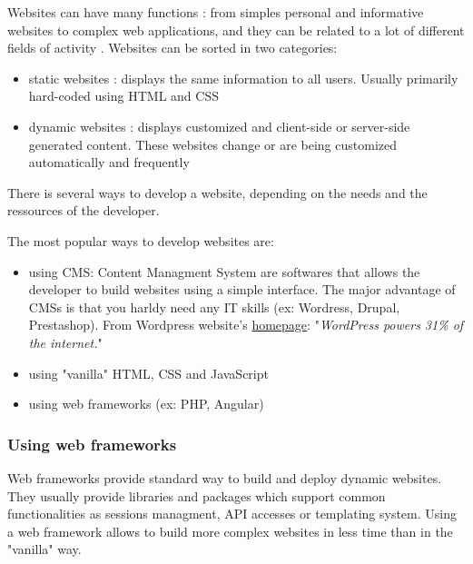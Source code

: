 \documentclass{article}
\begin{document}
                        Websites can have many functions : from simples personal and informative websites to complex web applications,
                        and they can be related to a lot of different fields of activity \cite{fields}.
                        Websites can be sorted in two categories:
                            \begin{itemize}
                                \item{static websites : displays the same information to all users. Usually primarily hard-coded using HTML and CSS}
                                \item{dynamic websites : displays customized and client-side or server-side generated content. These websites change or are being customized
                                automatically and frequently}
                            \end{itemize}
                        There is several ways to develop a website, depending on the needs and the ressources of the developer.

                        The most popular ways to develop websites are:
                            \begin{itemize}     
                                \item{using CMS: Content Managment System are softwares that allows the developer to build websites
                                using a simple interface.
                                The major advantage of CMSs is that you harldy need any IT skills (ex: Wordress, Drupal, Prestashop).
                                From Wordpress website's \href{https://en.wordpress.com/#hp-jetpack}{homepage}: "\textit{WordPress powers 31\% of the internet.}"
                                }
                                \item{using "vanilla" HTML, CSS and JavaScript}
                                \item{using web frameworks (ex: PHP, Angular)}
                            \end{itemize}       
                    \subsubsection{Using web frameworks}
                        Web frameworks provide standard way to build and deploy dynamic websites. They usually provide libraries and packages
                        which support common functionalities as sessions managment, API accesses or templating system. 
                        Using a web framework allows to build more complex websites in less time than in the "vanilla" way.
                        
\end{document}

